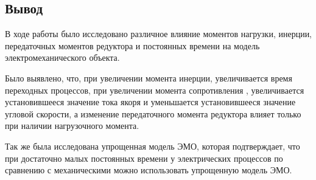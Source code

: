 \documentclass[a4paper, 12pt]{article}
\begin{document}
\newpage

\begin{center}
	\section*{Вывод}
\end{center}\par
В ходе работы было исследовано различное влияние моментов нагрузки, инерции, передаточных моментов редуктора и постоянных времени на модель электромеханического объекта.\par
Было выявлено, что, при увеличении момента инерции, увеличивается время переходных процессов, при увеличении момента сопротивления , увеличивается установившееся значение тока якоря и уменьшается установившееся значение угловой скорости, а изменение передаточного момента редуктора влияет только при наличии нагрузочного момента.\par
Так же была исследована упрощенная модель ЭМО, которая подтверждает, что при достаточно малых постоянных времени у электрических процессов по сравнению с механическими можно использовать упрощенную модель ЭМО.
\end{document}
